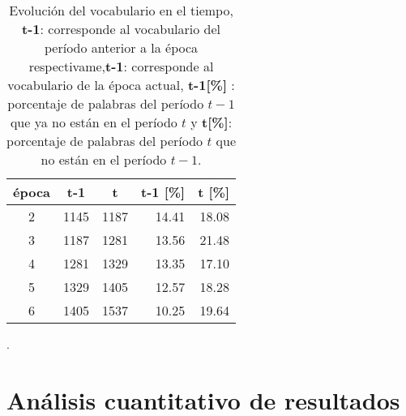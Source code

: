 \begin{table}[H]
    \begin{tabular}{|c|r|r|r|r|}
    \hline
    \textbf{época} & \multicolumn{1}{c|}{\textbf{t-1}} & \multicolumn{1}{c|}{\textbf{t}} & \multicolumn{1}{c|}{\textbf{t-1 {[}\%{]}}} & \multicolumn{1}{l|}{\textbf{t {[}\%{]}}} \\ \hline
    2              & 1145                              & 1187                            & 14.41                                      & 18.08                                    \\ \hline
    3              & 1187                              & 1281                            & 13.56                                      & 21.48                                    \\ \hline
    4              & 1281                              & 1329                            & 13.35                                      & 17.10                                    \\ \hline
    5              & 1329                              & 1405                            & 12.57                                      & 18.28                                    \\ \hline
    6              & 1405                              & 1537                            & 10.25                                      & 19.64                                    \\ \hline
    \end{tabular}
    \caption{Evolución del vocabulario en el tiempo, \textbf{t-1}: corresponde al vocabulario del período anterior a la época respectivame,\textbf{t-1}: corresponde al vocabulario de la época actual, \textbf{t-1[\%]}
    : porcentaje de palabras del período $t-1$ que ya no están en el período $t$ y \textbf{t[\%]}: porcentaje de palabras del período $t$ que no están en el período $t-1$.}
    \label{table:innovation_rate}.
\end{table}



\section{Análisis cuantitativo de resultados}
\label{sec:quantative}


